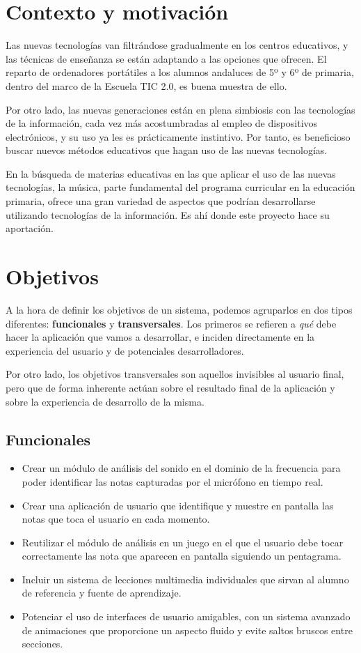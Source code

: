 \section{Contexto y motivación}
Las nuevas tecnologías van filtrándose gradualmente en los centros
educativos, y las técnicas de enseñanza se están adaptando a las
opciones que ofrecen. El reparto de ordenadores portátiles a los
alumnos andaluces de 5º y 6º de primaria, dentro del marco de la
Escuela TIC 2.0, es buena muestra de ello. 

Por otro lado, las nuevas generaciones están en plena simbiosis con
las tecnologías de la información, cada vez más acostumbradas al
empleo de dispositivos electrónicos, y su uso ya les es prácticamente
instintivo. Por tanto, es beneficioso buscar nuevos métodos educativos
que hagan uso de las nuevas tecnologías.

En la búsqueda de materias educativas en las que aplicar el uso de las
nuevas tecnologías, la música, parte fundamental del programa
curricular en la educación primaria, ofrece una gran variedad de
aspectos que podrían desarrollarse utilizando tecnologías de la
información. Es ahí donde este proyecto hace su aportación.

\section{Objetivos}
A la hora de definir los objetivos de un sistema, podemos agruparlos
en dos tipos diferentes: \textbf{funcionales} y
\textbf{transversales}. Los primeros se refieren a \textit{qué} debe
hacer la aplicación que vamos a desarrollar, e inciden
directamente en la experiencia del usuario y de potenciales
desarrolladores.

Por otro lado, los objetivos transversales son aquellos invisibles al
usuario final, pero que de forma inherente actúan sobre el resultado
final de la aplicación y sobre la experiencia de desarrollo de la misma.

\subsection{Funcionales}
\begin{itemize}
\item Crear un módulo de análisis del sonido en el dominio de la
  frecuencia para poder identificar las notas capturadas por el
  micrófono en tiempo real.
\item Crear una aplicación de usuario que identifique y muestre en
  pantalla las notas que toca el usuario en cada momento.
\item Reutilizar el módulo de análisis en un juego en el que el
  usuario debe tocar correctamente las nota que aparecen en pantalla
  siguiendo un pentagrama.
\item Incluir un sistema de lecciones multimedia individuales que
  sirvan al alumno de referencia y fuente de aprendizaje.
\item Potenciar el uso de interfaces de usuario amigables, con un
  sistema avanzado de animaciones que proporcione un aspecto fluido y
  evite saltos bruscos entre secciones.
\end{itemize}

